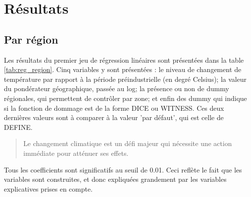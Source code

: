 \section{Résultats}

\subsection{Par région}

\begin{table}
    \centering
     \resizebox{\textwidth}{!}{}
     \label{tab:reg_region}
\end{table}

Les résultats du premier jeu de régression linéaires sont présentées dans la table \ref{tab:reg_region}. Cinq variables y sont présentées : le niveau de changement de température par rapport à la période préindustrielle (en degré Celsius); la valeur du pondérateur géographique, passée au log; la présence ou non de dummy régionales, qui permettent de contrôler par zone; et enfin des dummy qui indique si la fonction de dommage est de la forme DICE ou WITNESS. Ces deux dernières valeurs sont à comparer à la valeur 'par défaut', qui est celle de DEFINE. \\

\blockquote{Le changement climatique est un défi majeur qui nécessite une action immédiate pour atténuer ses effets.} 




Tous les coefficients sont significatifs au seuil de 0.01. Ceci reflète le fait que les variables sont construites, et donc expliquées grandement par les variables explicatives prises en compte. 

